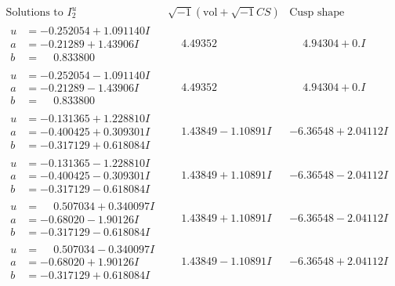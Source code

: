 \documentclass[1p]{elsarticle_modified}
\theoremstyle{definition}
\newcommand{\I}{\sqrt{-1}}
\begin{document}
$$\begin{array}{c|c|c}  
\text{Solutions to }I^u_{2}& \I (\text{vol} + \sqrt{-1}CS) & \text{Cusp shape}\\
 \hline 
\begin{aligned}
u &= -0.252054 + 1.091140 I \\
a &= -0.21289 + 1.43906 I \\
b &= \phantom{-}0.833800\phantom{ +0.000000I}\end{aligned}
 & \phantom{-}4.49352\phantom{ +0.000000I} & \phantom{-}4.94304 + 0. I\phantom{ +0.000000I} \\ \hline\begin{aligned}
u &= -0.252054 - 1.091140 I \\
a &= -0.21289 - 1.43906 I \\
b &= \phantom{-}0.833800\phantom{ +0.000000I}\end{aligned}
 & \phantom{-}4.49352\phantom{ +0.000000I} & \phantom{-}4.94304 + 0. I\phantom{ +0.000000I} \\ \hline\begin{aligned}
u &= -0.131365 + 1.228810 I \\
a &= -0.400425 + 0.309301 I \\
b &= -0.317129 + 0.618084 I\end{aligned}
 & \phantom{-}1.43849 - 1.10891 I & -6.36548 + 2.04112 I \\ \hline\begin{aligned}
u &= -0.131365 - 1.228810 I \\
a &= -0.400425 - 0.309301 I \\
b &= -0.317129 - 0.618084 I\end{aligned}
 & \phantom{-}1.43849 + 1.10891 I & -6.36548 - 2.04112 I \\ \hline\begin{aligned}
u &= \phantom{-}0.507034 + 0.340097 I \\
a &= -0.68020 - 1.90126 I \\
b &= -0.317129 - 0.618084 I\end{aligned}
 & \phantom{-}1.43849 + 1.10891 I & -6.36548 - 2.04112 I \\ \hline\begin{aligned}
u &= \phantom{-}0.507034 - 0.340097 I \\
a &= -0.68020 + 1.90126 I \\
b &= -0.317129 + 0.618084 I\end{aligned}
 & \phantom{-}1.43849 - 1.10891 I & -6.36548 + 2.04112 I \\ \hline\begin{aligned}

\end{aligned}
\end{array}$$
\end{document}
